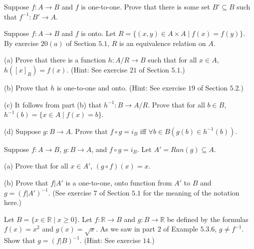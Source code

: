 \begin{tcolorbox}[title=Problem 12, breakable]
    Suppose $f : A \rightarrow B$ and $f$ is one-to-one.
    Prove that there is some set $B' \subseteq B$ 
        such that $f^{-1} : B' \rightarrow A$.
\end{tcolorbox}

\begin{tcolorbox}[title=Problem 13, breakable]
    Suppose $f : A \rightarrow B$ and $f$ is onto.
    Let $R = \{(x, y) \in A \times A \mid f(x) = f(y)\}$.
    By exercise $20(a)$ of Section $5.1$, $R$ is an equivalence
        relation on $A$.

    (a) Prove that there is a function $h : A / R \rightarrow B$ such that 
        for all $x \in A$, $h([x]_R) = f(x)$.
        (Hint: See exercise $21$ of Section $5.1.$)

    (b) Prove that $h$ is one-to-one and onto. (Hint: See exercise $19$ of 
        Section $5.2.$)

    (c) It follows from part (b) that $h^{-1} : B \rightarrow A / R$.
        Prove that for all $b \in B$, $h^{-1}(b) = \{x \in A \mid f(x) = b\}$.

    (d) Suppose $g : B \rightarrow A$. Prove that $f \circ g = i_B$
        iff $\forall{b} \in B(g(b) \in h^{-1}(b))$.
\end{tcolorbox}

\begin{tcolorbox}[title=Problem 14, breakable]
    Suppose $f : A \rightarrow B$, $g : B \rightarrow A$, and $f \circ g = i_B$.
    Let $A' = Ran(g) \subseteq A$.

    (a) Prove that for all $x \in A'$, $(g \circ f)(x) = x$.

    (b) Prove that $f | A'$ is a one-to-one, onto function from $A'$ to $B$
        and $g = (f | A')^{-1}$. (See exercise $7$ of Section $5.1$ for the 
        meaning of the notation here.)
\end{tcolorbox}

\begin{tcolorbox}[title=Problem 15, breakable]
    Let $B = \{x \in \mathbb{R} \mid x \ge 0\}$.
    Let $f : \mathbb{R} \rightarrow B$ and $g : B \rightarrow \mathbb{R}$
    be defined by the formulas $f(x) = x^2$ and $g(x) = \sqrt{x}$.
    As we saw in part $2$ of Example $5.3.6$, $g \ne f^{-1}$.
    Show that $g = (f | B)^{-1}$.
    (Hint: See exercise $14$.)
\end{tcolorbox}

